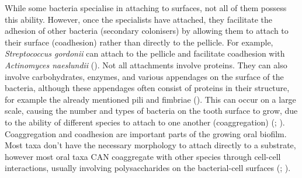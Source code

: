\documentclass[
  b5paper,
]{book}
\begin{document}
While some bacteria specialise in attaching to surfaces, not all of them
possess this ability. However, once the specialists have attached, they
facilitate the adhesion of other bacteria (secondary colonisers) by
allowing them to attach to their surface (coadhesion) rather than
directly to the pellicle. For example, \emph{Streptococcus gordonii} can
attach to the pellicle and facilitate coadhesion with \emph{Actinomyces
naeslundii} (). Not all attachments involve proteins. They can also
involve carbohydrates, enzymes, and various appendages on the surface of
the bacteria, although these appendages often consist of proteins in
their structure, for example the already mentioned pili and fimbriae
().
This can occur on a large scale, causing the number and types of
bacteria on the tooth surface to grow, due to the ability of different
species to attach to one another (coaggregation)
(;
). Coaggregation and
coadhesion are important parts of the growing oral biofilm. Most taxa
don't have the necessary morphology to attach directly to a substrate,
however most oral taxa CAN coaggregate with other species through
cell-cell interactions, usually involving polysaccharides on the
bacterial-cell surfaces
(; ).
\end{document}
